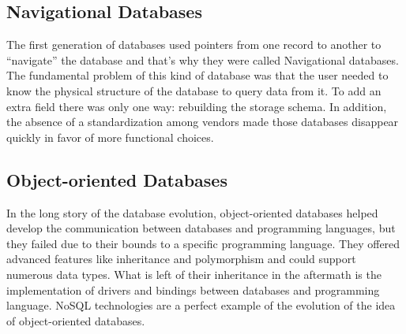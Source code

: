 \subsection{Navigational Databases}
The first generation of databases used pointers from one record to another to “navigate” the database and that’s why they were called Navigational databases.
The fundamental problem of this kind of database was that the user needed to know the physical structure of the database to query data from it. 
To add an extra field there was only one way: rebuilding the storage schema.
In addition, the absence of a standardization among vendors made those databases disappear quickly in favor of more functional choices.

\subsection{Object-oriented Databases}
In the long story of the database evolution, object-oriented databases helped develop the communication between databases and programming languages, but they failed due to their bounds to a specific programming language. They offered advanced features like inheritance and polymorphism and could support numerous data types.
What is left of their inheritance in the aftermath is the implementation of drivers and bindings between databases and programming language.
NoSQL technologies are a perfect example of the evolution of the idea of object-oriented databases.

